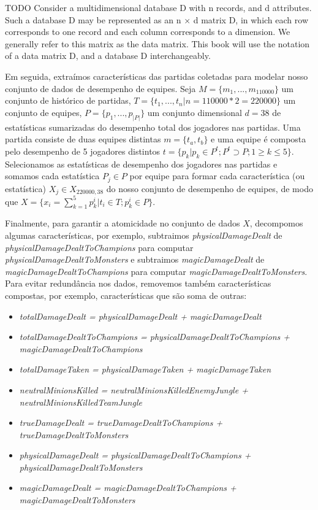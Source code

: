 TODO
Consider a multidimensional database D with n records, and d attributes. Such a database D may be represented as an n × d matrix D, in which each row corresponds to one record and each column corresponds to a dimension. We generally refer to this matrix as the data matrix. This book will use the notation of a data matrix D, and a database D interchangeably.


Em seguida, extraímos características das partidas coletadas para modelar nosso conjunto de dados de desempenho de equipes. Seja $M=\{m_1,...,m_{110000}\}$ um conjunto de histórico de partidas, $T=\{t_1, ..., t_n | n=110000 * 2=220000\}$ um conjunto de equipes, $P=\{p_1, ..., p_{|P|}\}$ um conjunto dimensional $d=38$ de estatísticas sumarizadas do desempenho total dos jogadores nas partidas. Uma partida consiste de duas equipes distintas $m=\{t_a,t_b\}$ e uma equipe é composta pelo desempenho de 5 jogadores distintos $t=\{p_k |  p_k \in P^t; P^t \supset P; 1 \geq k \leq 5\}$. Selecionamos as estatísticas de desempenho dos jogadores nas partidas e somamos cada estatística $P_j \in P$ por equipe para formar cada característica (ou estatística) $X_j \in X_{220000, 38}$ do nosso conjunto de desempenho de equipes, de modo que $X = \{ x_{i} = \sum_{k=1}^{5} p_{k}^{i} | t_{i} \in T; p_{k}^{i} \in P \}$.

Finalmente, para garantir a atomicidade no conjunto de dados $X$, decompomos algumas características, por exemplo, subtraimos \textit{physicalDamageDealt} de \textit{physicalDamageDealtToChampions} para computar \textit{physicalDamageDealtToMonsters} e subtraimos \textit{magicDamageDealt} de \textit{magicDamageDealtToChampions} para computar \textit{magicDamageDealtToMonsters}. Para evitar redundância nos dados, removemos também características compostas, por exemplo, características que são soma de outras:

\begin{itemize}
  \item \textit{totalDamageDealt = physicalDamageDealt + magicDamageDealt}
  \item \textit{totalDamageDealtToChampions = physicalDamageDealtToChampions + magicDamageDealtToChampions}
  \item \textit{totalDamageTaken = physicalDamageTaken + magicDamageTaken}
  \item \textit{neutralMinionsKilled = neutralMinionsKilledEnemyJungle + neutralMinionsKilledTeamJungle}
  \item \textit{trueDamageDealt = trueDamageDealtToChampions + trueDamageDealtToMonsters}
  \item \textit{physicalDamageDealt = physicalDamageDealtToChampions + physicalDamageDealtToMonsters}
  \item \textit{magicDamageDealt = magicDamageDealtToChampions + magicDamageDealtToMonsters}
\end{itemize}


